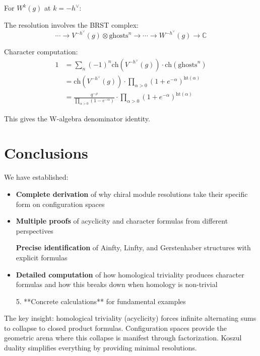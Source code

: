 \begin{calculation}
For $W^{k}(g)$ at $k = -h^\vee$:

The resolution involves the BRST complex:
\[
\cdots \to V^{-h^\vee}(g) \otimes \text{ghosts}^n \to \cdots \to W^{-h^\vee}(g) \to \mathbb{C}
\]

Character computation:
\begin{align}
1 &= \sum_n (-1)^n \text{ch}(V^{-h^\vee}(g)) \cdot \text{ch}(\text{ghosts}^n) \\
&= \text{ch}(V^{-h^\vee}(g)) \cdot \prod_{\alpha > 0} (1 + e^{-\alpha})^{\text{ht}(\alpha)} \\
&= \frac{q^{-\rho}}{\prod_{\alpha > 0}(1 - e^{-\alpha})} \cdot \prod_{\alpha > 0} (1 + e^{-\alpha})^{\text{ht}(\alpha)}
\end{align}

This gives the W-algebra denominator identity.
\end{calculation}

\section{Conclusions}

We have established:

\begin{itemize}
\item \textbf{Complete derivation} of why chiral module resolutions take their specific form on configuration spaces

\item \textbf{Multiple proofs} of acyclicity and character formulas from different perspectives

\textbf{Precise identification} of Ainfty, Linfty, and Gerstenhaber structures with explicit formulas

\item \textbf{Detailed computation} of how homological triviality produces character formulas and how this breaks down when homology is non-trivial

5. **Concrete calculations** for fundamental examples
\end{itemize}
The key insight: homological triviality (acyclicity) forces infinite alternating sums to collapse to closed product formulas. Configuration spaces provide the geometric arena where this collapse is manifest through factorization. Koszul duality simplifies everything by providing minimal resolutions.